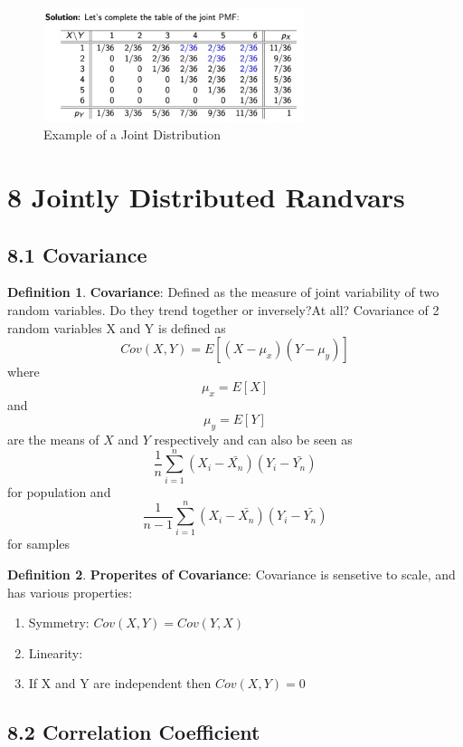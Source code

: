 \documentclass[12pt]{amsart}
\theoremstyle{definition}
\newtheorem{definition}{Definition} %
\numberwithin{equation}{theorem}    %
\begin{document}
\begin{figure}[H]
    \centering
    \includegraphics[width=3in]{Media/jointdist.png}
    \caption{Example of a Joint Distribution}
    \label{joint distribution}
\end{figure}


\section*{8 Jointly Distributed Randvars}

\subsection*{8.1 Covariance}

\begin{definition}
    \textbf{Covariance}:
    Defined as the measure of joint variability of two random variables. Do they trend together or inversely?At all?
    Covariance of 2 random variables X and Y is defined as $$Cov(X,Y) = E[(X-\mu_x)(Y-\mu_y)]$$ where $$\mu_x = E[X]$$ and $$\mu_y = E[Y]$$ are the means of $X$ and $Y$ respectively and can also be seen as 
    $$\frac{1}{n}\sum_{i=1}^{n}(X_i - \bar{X_n})(Y_i-\bar{Y_n})$$ for population and $$\frac{1}{n-1}\sum_{i=1}^{n}(X_i - \bar{X_n})(Y_i-\bar{Y_n})$$ for samples
\end{definition}

\begin{definition}
    \textbf{Properites of Covariance}:
    Covariance is sensetive to scale, and has various properties:
    \begin{enumerate}
        \item Symmetry: $Cov(X,Y) = Cov(Y,X)$
        \item Linearity: 
        \item If X and Y are independent then $Cov(X,Y) =0$
    \end{enumerate}
\end{definition}


\subsection*{8.2 Correlation Coefficient}
\end{document}
